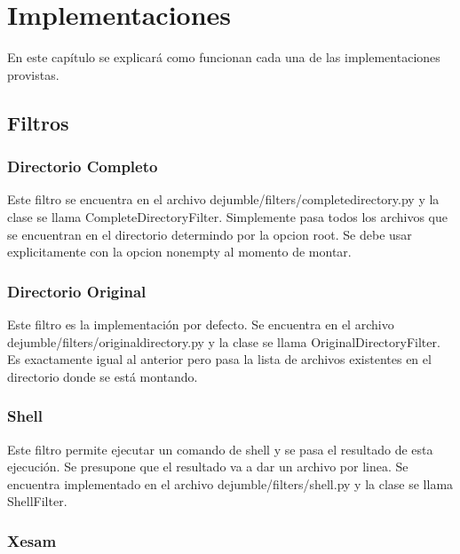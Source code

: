 \chapter{Implementaciones}
\ifpdf
    \graphicspath{{Chapter2/Chapter2Figs/PNG/}{Chapter2/Chapter2Figs/PDF/}{Chapter2/Chapter2Figs/}}
\else
    \graphicspath{{Chapter2/Chapter2Figs/EPS/}{Chapter2/Chapter2Figs/}}
\fi

En este capítulo se explicará como funcionan cada una de las implementaciones provistas.


\section{Filtros}

\subsection{Directorio Completo}

Este filtro se encuentra en el archivo dejumble/filters/completedirectory.py y la clase se llama CompleteDirectoryFilter. Simplemente pasa todos los archivos que se encuentran en el directorio determindo por la opcion root. Se debe usar explicitamente con la opcion nonempty al momento de montar.

\subsection{Directorio Original}

Este filtro es la implementación por defecto. Se encuentra en el archivo dejumble/filters/originaldirectory.py y la clase se llama OriginalDirectoryFilter. Es exactamente igual al anterior pero pasa la lista de archivos existentes en el directorio donde se está montando.

\subsection{Shell}

Este filtro permite ejecutar un comando de shell y se pasa el resultado de esta ejecución. Se presupone que el resultado va a dar un archivo por linea. Se encuentra implementado en el archivo dejumble/filters/shell.py y la clase se llama ShellFilter.

\subsection{Xesam}

